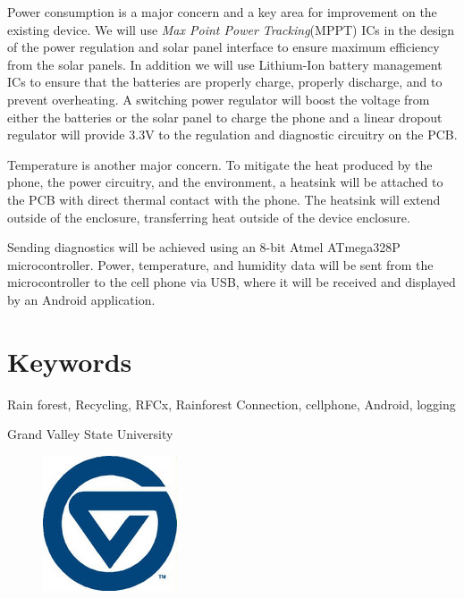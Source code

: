\documentclass{article}
\newcommand{\Footer}{Grand Valley State University}
\numberwithin{figure}{section}
\numberwithin{equation}{section}
\begin{document}
\begin{flushleft}
\bigskip
Power consumption is a major concern and a key area for improvement on the existing device. We will use \textit{Max Point Power Tracking}(MPPT) ICs in the design of the power regulation and solar panel interface to ensure maximum efficiency from the solar panels. In addition we will use Lithium-Ion battery management ICs to ensure that the batteries are properly charge, properly discharge, and to prevent overheating. A switching power regulator will boost the voltage from either the batteries or the solar panel to charge the phone and a linear dropout regulator will provide 3.3V to the regulation and diagnostic circuitry on the PCB.

\bigskip
Temperature is another major concern. To mitigate the heat produced by the phone, the power circuitry, and the environment, a heatsink will be attached to the PCB with direct thermal contact with the phone. The heatsink will extend outside of the enclosure, transferring heat outside of the device enclosure.

\bigskip
Sending diagnostics will be achieved using an 8-bit Atmel ATmega328P microcontroller. Power, temperature, and humidity data will be sent from the microcontroller to the cell phone via USB, where it will be received and displayed by an Android application.

\section*{Keywords} \label{sect:keywords}
Rain forest, Recycling, RFCx, Rainforest Connection, cellphone, Android, logging

\vfill

\begin{center}
{\large \Footer}
\end{center}
\begin{figure}[H]
  \centering
  \includegraphics[width=.1\textwidth]{small_gvsu}
\end{figure}
\end{flushleft}
\restoregeometry
\newpage
\end{document}
